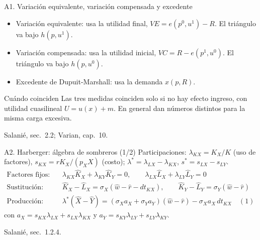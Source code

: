 \documentclass[aspectratio=169,11pt]{beamer}
\newcommand{\fuente}[1]{\par\vfill{\small\color{cGris}#1\par}}
\begin{document}
\begin{frame}{A1. Variación equivalente, variación compensada y excedente}
  \begin{itemize}
    \item Variación equivalente: usa la utilidad final, $VE = e(p^0,u^1) - R$. El triángulo va bajo $h(p,u^1)$.
    \item Variación compensada: usa la utilidad inicial, $VC = R - e(p^1,u^0)$. El triángulo va bajo $h(p,u^0)$.
    \item Excedente de Dupuit-Marshall: usa la demanda $x(p,R)$.
  \end{itemize}
  \pause
  \begin{block}{Cuándo coinciden}
    Las tres medidas coinciden solo si no hay efecto ingreso, con utilidad cuasilineal $U = u(x) + m$. En general dan números distintos para la misma carga excesiva.
  \end{block}
  \fuente{Salanié, sec.~2.2; Varian, cap.~10.}
\end{frame}

\begin{frame}{A2. Harberger: álgebra de sombreros (1/2)}
  \small
  Participaciones: $\lambda_{KX}=K_X/K$ (uso de factores), $s_{KX}=rK_X/(p_X X)$ (costo); $\lambda^*=\lambda_{LX}-\lambda_{KX}$, $s^*=s_{LX}-s_{LY}$.
  \begin{align*}
    \text{Factores fijos:}\quad & \lambda_{KX}\hat K_X + \lambda_{KY}\hat K_Y = 0, \qquad \lambda_{LX}\hat L_X + \lambda_{LY}\hat L_Y = 0\\
    \text{Sustitución:}\quad & \hat K_X - \hat L_X = \sigma_X(\hat w - \hat r - dt_{KX}), \qquad \hat K_Y - \hat L_Y = \sigma_Y(\hat w - \hat r)\\
    \text{Producción:}\quad & \lambda^*(\hat X - \hat Y) = (\sigma_X a_X + \sigma_Y a_Y)(\hat w - \hat r) - \sigma_X a_X\,dt_{KX}\quad (1)
  \end{align*}
  con $a_X = s_{KX}\lambda_{LX} + s_{LX}\lambda_{KX}$ y $a_Y = s_{KY}\lambda_{LY} + s_{LY}\lambda_{KY}$.
  \fuente{Salanié, sec.~1.2.4.}
\end{frame}
\end{document}
